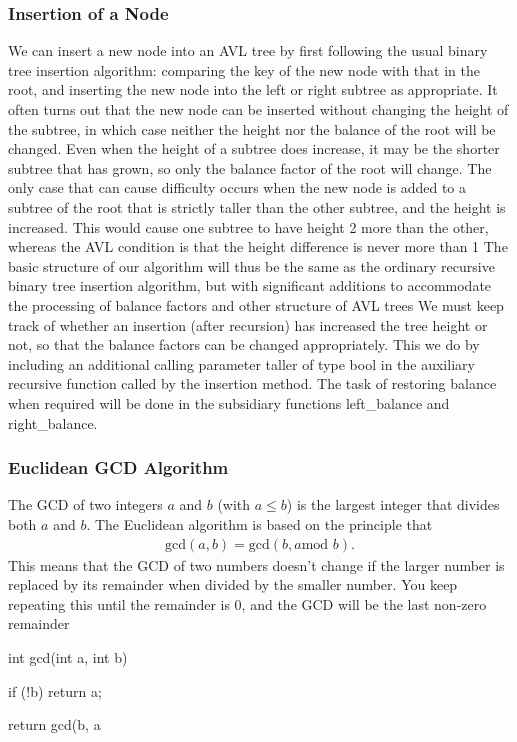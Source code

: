 \documentclass{report}
\begin{document}
\subsubsection{Insertion of a Node}
\bigbreak \noindent 
We can insert a new node into an AVL tree by first following the usual binary tree
insertion algorithm: comparing the key of the new node with that in the root, and
inserting the new node into the left or right subtree as appropriate. It often turns
out that the new node can be inserted without changing the height of the subtree,
in which case neither the height nor the balance of the root will be changed. Even
when the height of a subtree does increase, it may be the shorter subtree that has
grown, so only the balance factor of the root will change. The only case that can
cause difficulty occurs when the new node is added to a subtree of the root that is
strictly taller than the other subtree, and the height is increased. This would cause
one subtree to have height 2 more than the other, whereas the AVL condition is
that the height difference is never more than 1
\bigbreak \noindent 
The basic structure of our algorithm will thus be the same as the ordinary recursive binary tree insertion algorithm, but with significant additions to accommodate the processing of balance factors and other structure of AVL trees
\bigbreak \noindent 
We must keep track of whether an insertion (after recursion) has increased the tree height or not, so that the balance factors can be changed appropriately. This we do by including an additional calling parameter taller of type bool in the auxiliary recursive function called by the insertion method. The task of restoring balance when required will be done in the subsidiary functions left\_balance and right\_balance.


















\pagebreak 
{}
\bigbreak \noindent 
\subsubsection{Euclidean GCD Algorithm}
\bigbreak \noindent 
The GCD of two integers $a$ and $b$ (with $a \leq b$) is the largest integer that divides both $a$ and $b$. The Euclidean algorithm is based on the principle that
\begin{align*}
    \text{gcd}(a,b) = \text{gcd}(b, a \text{mod } b)
.\end{align*}
\bigbreak \noindent 
This means that the GCD of two numbers doesn't change if the larger number is replaced by its remainder when divided by the smaller number. You keep repeating this until the remainder is 0, and the GCD will be the last non-zero remainder
\bigbreak \noindent 
\begin{cppcode}
    int gcd(int a, int b)  {
        if (!b) return a;

        return gcd(b, a%
    }
\end{cppcode}
\end{document}
